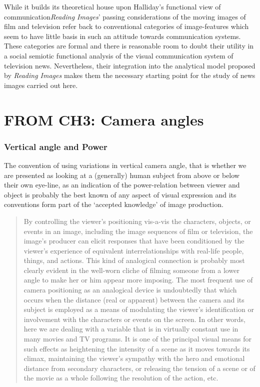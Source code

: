 While it builds its theoretical house upon Halliday's functional view of communication\emph{Reading Images}' passing considerations of the moving images of film and television refer back to conventional categories of image-features which seem to have little basis in such an attitude towards communication systems. These categories are formal and there is reasonable room to doubt their utility in a social semiotic functional analysis of the visual communication system of television news. Nevertheless, their integration into the analytical model proposed by \textit{Reading Images} makes them the necessary starting point for the study of news images carried out here.

\section{FROM CH3: Camera angles}\label{sec:camangles}

\subsubsection{Vertical angle and Power}\label{subsubsec:vang}

The convention of using variations in vertical camera angle, that is whether we are presented as looking at a (generally) human subject from above or below their own eye-line, as an indication of the power-relation between viewer and object is probably the best known of any aspect of visual expression and its conventions form part of the `accepted knowledge' of image production.

\begin{quote}
By controlling the viewer's positioning vis-a-vis the characters, objects, or events in an image, including the image sequences of film or television, the image's producer can elicit responses that have been conditioned by the viewer's experience of equivalent interrelationships with real-life people, things, and actions. This kind of analogical connection is probably most clearly evident in the well-worn cliche of filming someone from a lower angle to make her or him appear more imposing. The most frequent use of camera positioning as an analogical device is undoubtedly that which occurs when the distance (real or apparent) between the camera and its subject is employed as a means of modulating the viewer's identification or involvement with the characters or events on the screen. In other words, here we are dealing with a variable that is in virtually constant use in many movies and TV programs. It is one of the principal visual means for such effects as heightening the intensity of a scene as it moves towards its climax, maintaining the viewer's sympathy with the hero and emotional distance from secondary characters, or releasing the tension of a scene or of the movie as a whole following the resolution of the action, etc. \citep[4]{Messaris:1998}
\end{quote}

